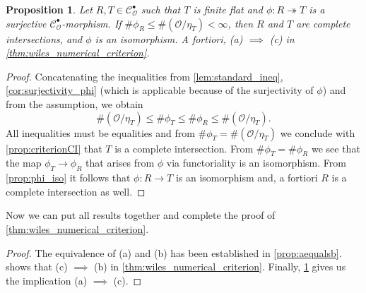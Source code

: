 \documentclass{article}
\theoremstyle{plain}%
\newtheorem{proposition}[theorem]{Proposition}
\theoremstyle{definition}
\theoremstyle{remark}
\newcommand{\cob}{\mathcal{C}_\mathcal{O}^\bullet}
\begin{document}
\begin{proposition}\textup{\cite[theorem 5.28]{Darmon1995}}\label{prop:aimpliesc}
    Let \(R, T \in \cob\) such that \(T\) is finite flat and 
    \(\phi\colon R \twoheadrightarrow T\) is a surjective \(\cob\)-morphism.
    If \(\# \phi_R \leq \#(\mathcal{O}/\eta_T) < \infty\), then \(R\) and \(T\) are complete intersections,
    and \(\phi\) is an isomorphism.
    A fortiori, (a) \(\implies\) (c) in \cref{thm:wiles_numerical_criterion}.
\end{proposition}
\begin{proof}
    Concatenating the inequalities from \cref{lem:standard_ineq}, 
    \cref{cor:surjectivity_phi} (which is applicable because of the surjectivity of \(\phi\))
    and from the assumption, we obtain
    \[
        \#(\mathcal{O}/\eta_T) \leq \#\phi_T \leq \#\phi_R \leq \#(\mathcal{O}/\eta_T).
    \]
    All inequalities must be equalities and from \(\#\phi_T = \#(\mathcal{O}/\eta_T)\)
    we conclude with \cref{prop:criterionCI} that \(T\) is a complete intersection.
    From \(\#\phi_T = \#\phi_R \) we see that the map \(\phi_T \to \phi_R\) that arises from
    \(\phi\) via functoriality is an isomorphism.
    From \cref{prop:phi_iso} it follows that \(\phi\colon R \to T\) is an isomorphism and, 
    a fortiori \(R\) is a complete intersection as well.
\end{proof}

Now we can put all results together and complete the proof of \cref{thm:wiles_numerical_criterion}.
\renewcommand{\qedsymbol}{s.d.g.}
\begin{proof}
    The equivalence of (a) and (b) has been established in \cref{prop:aequalsb}.
     shows that (c) \(\implies\) (b) in \cref{thm:wiles_numerical_criterion}.
    Finally, \cref{prop:aimpliesc} gives us the implication (a) \(\implies\) (c).
\end{proof}

\newpage
\printbibliography
\end{document}
